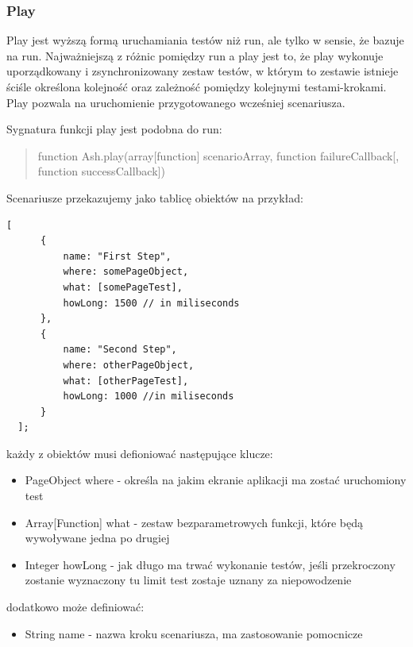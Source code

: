 \documentclass[brudnopis]{xmgr}
\begin{document}
\subsubsection{Play} 

Play jest wyższą formą uruchamiania testów niż run, ale tylko w sensie, że bazuje na run. Najważniejszą z różnic pomiędzy run a play jest to, że play wykonuje uporządkowany i zsynchronizowany zestaw testów, w którym to zestawie istnieje ściśle określona kolejność oraz zależność pomiędzy kolejnymi testami-krokami. Play pozwala na uruchomienie przygotowanego wcześniej scenariusza. 

Sygnatura funkcji play jest podobna do run:

\begin{quote}
function Ash.play(array[function] scenarioArray, function failureCallback[, function successCallback]) 
\end{quote}

Scenariusze przekazujemy jako tablicę obiektów na przykład:

\begin{lstlisting}
[
      {
          name: "First Step",
          where: somePageObject,
          what: [somePageTest],
          howLong: 1500	// in miliseconds
      },
      {
          name: "Second Step",
          where: otherPageObject,
          what: [otherPageTest],
          howLong: 1000	//in miliseconds
      }
  ];
\end{lstlisting}

każdy z obiektów musi defioniować następujące klucze:

\begin{itemize}
  \item PageObject where - określa na jakim ekranie aplikacji ma zostać uruchomiony test
  \item Array[Function] what - zestaw bezparametrowych funkcji, które będą wywoływane jedna po drugiej 
  \item Integer howLong - jak długo ma trwać wykonanie testów, jeśli przekroczony zostanie wyznaczony tu limit test zostaje uznany za niepowodzenie 
\end{itemize}

dodatkowo może definiować:

\begin{itemize} 
  \item String name - nazwa kroku scenariusza, ma zastosowanie pomocnicze
\end{itemize}
\end{document}
